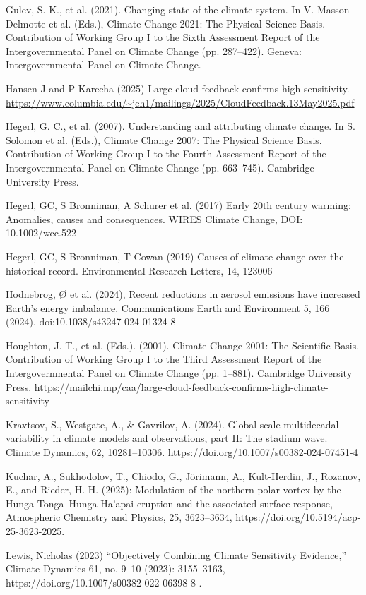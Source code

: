 \documentclass[12pt,paper=a4,DIV=12,parskip=never,chapterprefix=false,headings=standardclasses]{scrreprt}
\begin{document}
Gulev, S. K., et al. (2021). Changing state of the climate system. In V. Masson-Delmotte et al. (Eds.),
Climate Change 2021: The Physical Science Basis. Contribution of Working Group I to the Sixth
Assessment Report of the Intergovernmental Panel on Climate Change (pp. 287–422). Geneva:
Intergovernmental Panel on Climate Change.

Hansen J and P Karecha (2025) Large cloud feedback confirms high sensitivity.
\url{https://www.columbia.edu/~jeh1/mailings/2025/CloudFeedback.13May2025.pdf}

Hegerl, G. C., et al. (2007). Understanding and attributing climate change. In S. Solomon et al. (Eds.),
Climate Change 2007: The Physical Science Basis. Contribution of Working Group I to the Fourth
Assessment Report of the Intergovernmental Panel on Climate Change (pp. 663–745). Cambridge
University Press.

Hegerl, GC, S Bronniman, A Schurer et al. (2017) Early 20th century warming: Anomalies, causes and
consequences. WIRES Climate Change, DOI: 10.1002/wcc.522

Hegerl, GC, S Bronniman, T Cowan (2019) Causes of climate change over the historical record.
Environmental Research Letters, 14, 123006

Hodnebrog, Ø et al. (2024), Recent reductions in aerosol emissions have increased Earth’s energy
imbalance. Communications Earth and Environment 5, 166 (2024). doi:10.1038/s43247-024-01324-8

Houghton, J. T., et al. (Eds.). (2001). Climate Change 2001: The Scientific Basis. Contribution of
Working Group I to the Third Assessment Report of the Intergovernmental Panel on Climate Change
(pp. 1–881). Cambridge University Press.
https://mailchi.mp/caa/large-cloud-feedback-confirms-high-climate-sensitivity

Kravtsov, S., Westgate, A., \& Gavrilov, A. (2024). Global-scale multidecadal variability in climate
models and observations, part II: The stadium wave. Climate Dynamics, 62, 10281–10306.
https://doi.org/10.1007/s00382-024-07451-4

Kuchar, A., Sukhodolov, T., Chiodo, G., Jörimann, A., Kult-Herdin, J., Rozanov, E., and Rieder, H. H.
(2025): Modulation of the northern polar vortex by the Hunga Tonga–Hunga Ha'apai eruption and the
associated surface response, Atmospheric Chemistry and Physics, 25, 3623–3634,
https://doi.org/10.5194/acp-25-3623-2025.

Lewis, Nicholas (2023) “Objectively Combining Climate Sensitivity Evidence,” Climate Dynamics 61,
no. 9–10 (2023): 3155–3163, https://doi.org/10.1007/s00382-022-06398-8 .
\end{document}
